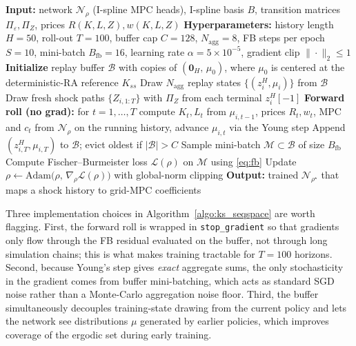 \documentclass[11pt,a4paper]{report}
\begin{document}
\begin{definitionbox}
\label{algo:ks_seqspace}
\begin{algorithmic}
\small
\STATE \textbf{Input:} network $\mathcal{N}_\rho$ (I-spline MPC heads), I-spline basis $B$, transition matrices $\Pi_\varepsilon, \Pi_Z$, prices $R(K,L,Z), w(K,L,Z)$
\STATE \textbf{Hyperparameters:} history length $H{=}50$, roll-out $T{=}100$, buffer cap $C{=}128$, $N_{\text{agg}}{=}8$, FB steps per epoch $S{=}10$, mini-batch $B_{\text{fb}}{=}16$, learning rate $\alpha{=}5\!\times\!10^{-5}$, gradient clip $\|\cdot\|_2 \le 1$
\STATE \textbf{Initialize} replay buffer $\mathcal{B}$ with copies of $(\mathbf{0}_H,\, \mu_0)$, where $\mu_0$ is centered at the deterministic-RA reference $K_{ss}$
    \STATE Draw $N_{\text{agg}}$ replay states $\{(z^H_i, \mu_i)\}$ from $\mathcal{B}$
    \STATE Draw fresh shock paths $\{Z_{i,1:T}\}$ with $\Pi_Z$ from each terminal $z^H_i[-1]$
        \STATE \textbf{Forward roll (no grad):} for $t=1,\ldots,T$ compute $K_t,L_t$ from $\mu_{i,t-1}$, prices $R_t,w_t$, MPC and $c_t$ from $\mathcal{N}_\rho$ on the running history, advance $\mu_{i,t}$ via the Young step
        \STATE Append $(z^H_{i,T}, \mu_{i,T})$ to $\mathcal{B}$; evict oldest if $|\mathcal{B}| > C$
    \ENDFOR
        \STATE Sample mini-batch $\mathcal{M}\subset\mathcal{B}$ of size $B_{\text{fb}}$
        \STATE Compute Fischer--Burmeister loss $\mathcal{L}(\rho)$ on $\mathcal{M}$ using \eqref{eq:fb}
        \STATE Update $\rho \leftarrow \mathrm{Adam}\bigl(\rho,\, \nabla_\rho \mathcal{L}(\rho)\bigr)$ with global-norm clipping
    \ENDFOR
\ENDFOR
\STATE \textbf{Output:} trained $\mathcal{N}_{\rho^\star}$ that maps a shock history to grid-MPC coefficients
\end{algorithmic}
\end{definitionbox}

Three implementation choices in Algorithm~\ref{algo:ks_seqspace} are worth flagging.  First, the forward roll is wrapped in \texttt{stop\_gradient} so that gradients only flow through the FB residual evaluated on the buffer, not through long simulation chains; this is what makes training tractable for $T = 100$ horizons.  Second, because Young's step gives \emph{exact} aggregate sums, the only stochasticity in the gradient comes from buffer mini-batching, which acts as standard SGD noise rather than a Monte-Carlo aggregation noise floor.  Third, the buffer simultaneously decouples training-state drawing from the current policy and lets the network see distributions $\mu$ generated by earlier policies, which improves coverage of the ergodic set during early training.
\end{document}
